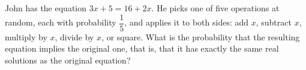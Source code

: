 John has the equation $3x+5=16+2x$. He picks one of five operations at random, each with probability $\dfrac15$, and applies it to both sides: add $x$, subtract $x$, multiply by $x$, divide by $x$, or square. What is the probability that the resulting equation implies the original one, that is, that it has exactly the same real solutions as the original equation?
